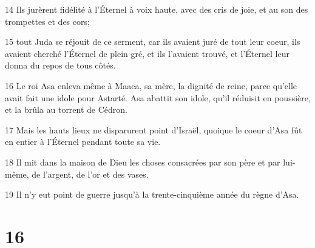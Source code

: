 \par 14 Ils jurèrent fidélité à l'Éternel à voix haute, avec des cris de joie, et au son des trompettes et des cors;
\par 15 tout Juda se réjouit de ce serment, car ils avaient juré de tout leur coeur, ils avaient cherché l'Éternel de plein gré, et ils l'avaient trouvé, et l'Éternel leur donna du repos de tous côtés.
\par 16 Le roi Asa enleva même à Maaca, sa mère, la dignité de reine, parce qu'elle avait fait une idole pour Astarté. Asa abattit son idole, qu'il réduisit en poussière, et la brûla au torrent de Cédron.
\par 17 Mais les hauts lieux ne disparurent point d'Israël, quoique le coeur d'Asa fût en entier à l'Éternel pendant toute sa vie.
\par 18 Il mit dans la maison de Dieu les choses consacrées par son père et par lui-même, de l'argent, de l'or et des vases.
\par 19 Il n'y eut point de guerre jusqu'à la trente-cinquième année du règne d'Asa.

\chapter{16}

